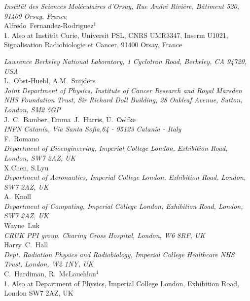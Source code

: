 \noindent \textit{Instit\"ut des Sciences Mol\'eculaires d'Orsay, Rue Andr\'e Rivi\`ere, B\^atiment 520, 91400 Orsay, France} \\
Alfredo~Fernandez-Rodriguez$^{1}$ \\
{\footnotesize
  1. Also at Instit\"ut Curie, Universit PSL, CNRS UMR3347, Inserm U1021, Signalisation Radiobiologie et Cancer, 91400 Orsay, France \\
}
 
\noindent \textit{Lawrence Berkeley National Laboratory, 1 Cyclotron Road, Berkeley, CA 94720, USA} \\
L.~Obst-Huebl, A.M.~Snijders \\
 
\noindent \textit{Joint Department of Physics, Institute of Cancer Research and Royal Marsden NHS Foundation Trust, Sir Richard Doll Building, 28 Oakleaf Avenue, Sutton, London, SM2 5GP} \\
J.~C.~Bamber, Emma~J.~Harris, U.~Oelfke \\
 
\noindent \textit{INFN Catania, Via Santa Sofia,64 - 95123 Catania - Italy} \\
F.~Romano \\
 
\noindent \textit{Department of Bioengineering, Imperial College London, Exhibition Road, London, SW7 2AZ, UK} \\
X.Chen, S.Lyu \\
 
\noindent \textit{Department of Aeronautics, Imperial College London, Exhibition Road, London, SW7 2AZ, UK} \\
A.~Knoll \\
 
\noindent \textit{Department of Computing, Imperial College London, Exhibition Road, London, SW7 2AZ, UK} \\
Wayne~Luk \\
 
\noindent \textit{CRUK PPI group, Charing Cross Hospital, London, W6 8RF, UK} \\
Harry~C.~Hall \\
 
\noindent \textit{Dept. Radiation Physics and Radiobiology, Imperial College Healthcare NHS Trust, London, W2 1NY, UK} \\
C.~Hardiman, R.~McLauchlan$^{1}$ \\
{\footnotesize
  1. Also at Department of Physics, Imperial College London, Exhibition Road, London SW7 2AZ, UK \\
}
 
